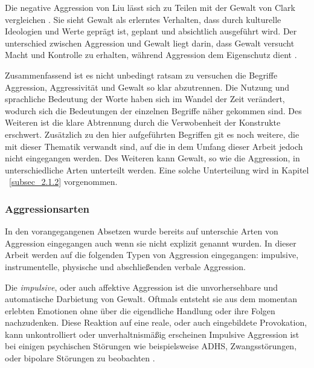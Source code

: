 Die negative Aggression von Liu lässt sich zu Teilen mit der Gewalt von Clark vergleichen \parencite{Def_Aggressivität_vs_violence, Aggression}.
Sie sieht Gewalt als erlerntes Verhalten, dass durch kulturelle Ideologien und Werte geprägt 
ist,  geplant und absichtlich ausgeführt wird. Der unterschied zwischen Aggression und Gewalt
liegt darin, dass Gewalt versucht Macht und Kontrolle zu erhalten, während Aggression dem 
Eigenschutz dient \parencite{Def_Aggressivität_vs_violence}.

Zusammenfassend ist es nicht unbedingt ratsam zu versuchen die Begriffe Aggression, 
Aggressivität und Gewalt so klar abzutrennen. Die Nutzung und sprachliche Bedeutung der Worte
haben sich im Wandel der Zeit verändert, wodurch sich die Bedeutungen der einzelnen Begriffe 
näher gekommen sind. Des Weiteren ist die klare Abtrennung durch die Verwobenheit der Konstrukte
erschwert. Zusätzlich zu den hier aufgeführten Begriffen git es noch weitere, die mit dieser
Thematik verwandt sind, auf die in dem Umfang dieser Arbeit jedoch nicht eingegangen werden.
Des Weiteren kann Gewalt, so wie die Aggression, in unterschiedliche Arten unterteilt werden.
Eine solche Unterteilung wird in Kapitel ~\ref{subsec_2.1.2} vorgenommen.



\subsubsection{Aggressionsarten}    \label{subsubsec_2.1.3.1}
In den vorangegangenen Absetzen wurde bereits auf unterschie Arten von Aggression eingegangen
auch wenn sie nicht explizit genannt wurden. In dieser Arbeit werden auf die folgenden Typen
von Aggression eingegangen: impulsive, instrumentelle, physische und abschließenden verbale 
Aggression.

Die \textit{impulsive}, oder auch affektive Aggression ist die unvorhersehbare und automatische 
Darbietung von Gewalt. Oftmals entsteht sie aus dem momentan erlebten Emotionen ohne über die 
eigendliche Handlung oder ihre Folgen nachzudenken. Diese Reaktion auf eine reale, oder auch 
eingebildete Provokation, kann unkontrolliert oder unverhaltnismäßig erscheinen \parencite{impulsive_instrumental_aggro_healtline, impulsive_aggro}
Impulsive Aggression ist bei einigen psychischen Störungen wie beispielsweise ADHS, 
Zwangsstörungen, oder bipolare Störungen zu beobachten \parencite{impulsive_aggro_psych_Störung}.

